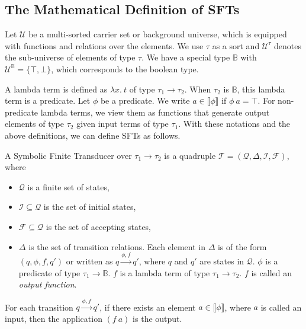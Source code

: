 \documentclass[sigplan,10pt,anonymous,review]{acmart}\settopmatter{printfolios=true,printccs=false,printacmref=false}
\begin{document}
\subsection{The Mathematical Definition of SFTs}

Let $\mathcal{U}$ be a multi-sorted carrier set or background universe, which is equipped with functions and relations over the elements. We use $\tau$ as a sort and $\mathcal{U}^\tau$ denotes the sub-universe of elements of type $\tau$. 
We have a special type $\mathbb{B}$ with $\mathcal{U}^\mathbb{B} = \{ \top, \bot\}$, which corresponds to the boolean type. 

A lambda term is defined as $\lambda x.~t$ of type $\tau_1 \rightarrow \tau_2$.
When $\tau_2$ is $\mathbb{B}$, this lambda term is a predicate. Let $\phi$ be a predicate. We write $a\in \llbracket\phi \rrbracket$ if $\phi~a=\top$. For non-predicate lambda terms, we view them as functions that generate output elements of type $\tau_2$ given input terms of type $\tau_1$. 
With these notations and the above definitions, we can define SFTs as follows.

\begin{definition}
\label{def-sft}
   A Symbolic Finite Transducer over $\tau_1\rightarrow \tau_2$ is a quadruple $\mathcal{T} = (\mathcal{Q}, \Delta, \mathcal{I}, \mathcal{F})$, where 
   \begin{itemize}
   \item $\mathcal{Q}$ is a finite set of states,
   \item $\mathcal{I}\subseteq \mathcal{Q}$ is the set of initial states,
   \item $\mathcal{F} \subseteq\mathcal{Q}$ is the set of accepting states,
   \item $\Delta$ is the set of transition relations. Each element in $\Delta$ is of the form $(q, \phi, f, q')$ or written as $q\xrightarrow{\phi, f} q'$, where $q$ and $q'$ are states in $\mathcal{Q}$.
   $\phi$ is a predicate of type $\tau_1\rightarrow \mathbb{B}$.
   $f$ is a lambda term of type $\tau_1\rightarrow \tau_2$. $f$ is called an \emph{output function}.
   \end{itemize}

For each transition $q\xrightarrow{\phi, f} q'$, if there exists an element $a\in \llbracket \phi \rrbracket$, where $a$ is called an input,  then the application $(f~a)$ is the output.
   
\end{definition}
\end{document}
